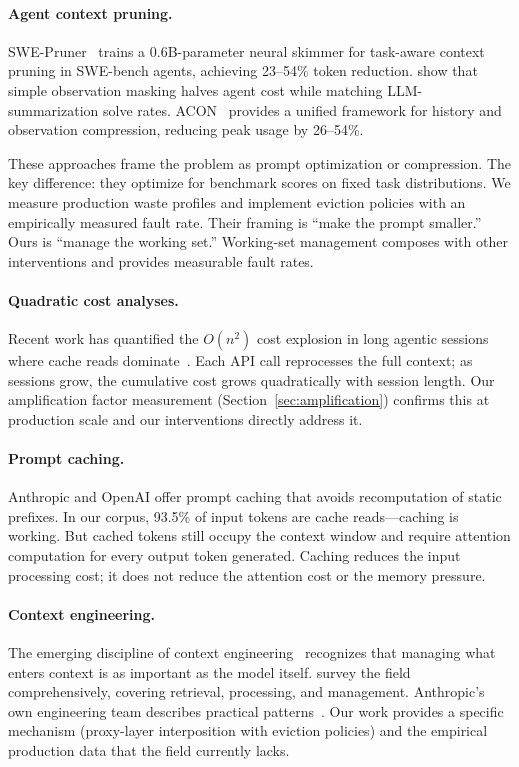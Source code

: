 \paragraph{Agent context pruning.}
SWE-Pruner~\citep{wang2026swepruner} trains a 0.6B-parameter neural
skimmer for task-aware context pruning in SWE-bench agents, achieving
23--54\% token reduction. \citet{lindenbauer2025complexity} show that
simple observation masking halves agent cost while matching
LLM-summarization solve rates. ACON~\citep{kang2025acon} provides a
unified framework for history and observation compression, reducing
peak usage by 26--54\%.

These approaches frame the problem as prompt optimization or
compression. The key difference: they optimize for benchmark scores
on fixed task distributions. We measure production waste profiles
and implement eviction policies with an empirically measured fault rate. Their
framing is ``make the prompt smaller.'' Ours is ``manage the working
set.'' Working-set management composes with other interventions and
provides measurable fault rates.

\paragraph{Quadratic cost analyses.}
Recent work has quantified the $O(n^2)$ cost explosion in long
agentic sessions where cache reads dominate~\citep{zeyliger2026quadratic}.
Each API call reprocesses the full context; as sessions grow, the
cumulative cost grows quadratically with session length. Our
amplification factor measurement (Section~\ref{sec:amplification})
confirms this at production scale and our interventions directly
address it.

\paragraph{Prompt caching.}
Anthropic and OpenAI offer prompt caching that avoids recomputation
of static prefixes. In our corpus, 93.5\% of input tokens are cache
reads---caching is working. But cached tokens still occupy the
context window and require attention computation for every output
token generated. Caching reduces the input processing cost; it does
not reduce the attention cost or the memory pressure.

\paragraph{Context engineering.}
The emerging discipline of context
engineering~\citep{deepset2025context,willison2025context,mei2025survey}
recognizes that managing what enters context is as important as the
model itself. \citet{mei2025survey} survey the field comprehensively,
covering retrieval, processing, and management. Anthropic's own
engineering team describes practical
patterns~\citep{rajasekaran2025context}. Our work provides a specific
mechanism (proxy-layer interposition with eviction policies) and the
empirical production data that the field currently lacks.

